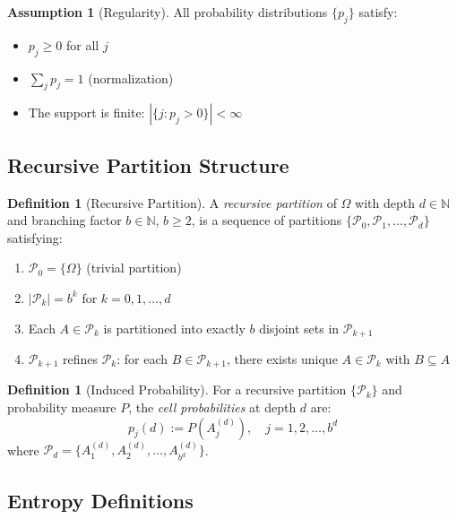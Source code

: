 \documentclass[11pt,a4paper]{article}
\theoremstyle{definition}
\newtheorem{definition}[theorem]{Definition}
\newtheorem{assumption}[theorem]{Assumption}
\theoremstyle{remark}
\newcommand{\N}{\mathbb{N}}
\newcommand{\Partition}{\mathcal{P}}
\begin{document}
\begin{assumption}[Regularity]
\label{ass:regularity}
All probability distributions $\{p_j\}$ satisfy:
\begin{itemize}[nosep]
    \item $p_j \geq 0$ for all $j$
    \item $\sum_j p_j = 1$ (normalization)
    \item The support is finite: $|\{j : p_j > 0\}| < \infty$
\end{itemize}
\end{assumption}

\subsection{Recursive Partition Structure}

\begin{definition}[Recursive Partition]
\label{def:recursive_partition}
A \emph{recursive partition} of $\Omega$ with depth $d \in \N$ and branching factor $b \in \N$, $b \geq 2$, is a sequence of partitions $\{\Partition_0, \Partition_1, \ldots, \Partition_d\}$ satisfying:
\begin{enumerate}[nosep]
    \item[(P1)] $\Partition_0 = \{\Omega\}$ (trivial partition)
    \item[(P2)] $|\Partition_k| = b^k$ for $k = 0, 1, \ldots, d$
    \item[(P3)] Each $A \in \Partition_k$ is partitioned into exactly $b$ disjoint sets in $\Partition_{k+1}$
    \item[(P4)] $\Partition_{k+1}$ refines $\Partition_k$: for each $B \in \Partition_{k+1}$, there exists unique $A \in \Partition_k$ with $B \subseteq A$
\end{enumerate}
\end{definition}

\begin{definition}[Induced Probability]
\label{def:induced_prob}
For a recursive partition $\{\Partition_k\}$ and probability measure $P$, the \emph{cell probabilities} at depth $d$ are:
\begin{equation}
    p_j(d) := P(A_j^{(d)}), \quad j = 1, 2, \ldots, b^d
\end{equation}
where $\Partition_d = \{A_1^{(d)}, A_2^{(d)}, \ldots, A_{b^d}^{(d)}\}$.
\end{definition}

\subsection{Entropy Definitions}
\end{document}
